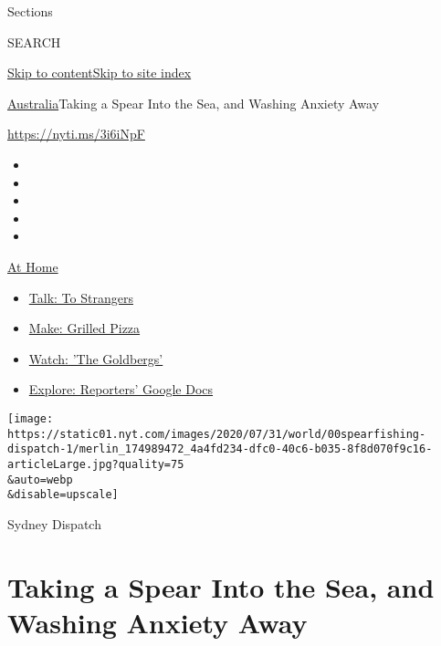 Sections

SEARCH

\protect\hyperlink{site-content}{Skip to
content}\protect\hyperlink{site-index}{Skip to site index}

\href{/section/world/australia}{Australia}\textbar{}Taking a Spear Into
the Sea, and Washing Anxiety Away

\url{https://nyti.ms/3i6iNpF}

\begin{itemize}
\item
\item
\item
\item
\item
\end{itemize}

\href{https://www.nytimes.com/spotlight/at-home?action=click\&pgtype=Article\&state=default\&region=TOP_BANNER\&context=at_home_menu}{At
Home}

\begin{itemize}
\tightlist
\item
  \href{https://www.nytimes.com/2020/08/03/well/family/the-benefits-of-talking-to-strangers.html?action=click\&pgtype=Article\&state=default\&region=TOP_BANNER\&context=at_home_menu}{Talk:
  To Strangers}
\item
  \href{https://www.nytimes.com/2020/08/01/at-home/coronavirus-make-pizza-on-a-grill.html?action=click\&pgtype=Article\&state=default\&region=TOP_BANNER\&context=at_home_menu}{Make:
  Grilled Pizza}
\item
  \href{https://www.nytimes.com/2020/07/31/arts/television/goldbergs-abc-stream.html?action=click\&pgtype=Article\&state=default\&region=TOP_BANNER\&context=at_home_menu}{Watch:
  'The Goldbergs'}
\item
  \href{https://www.nytimes.com/interactive/2020/at-home/even-more-reporters-editors-diaries-lists-recommendations.html?action=click\&pgtype=Article\&state=default\&region=TOP_BANNER\&context=at_home_menu}{Explore:
  Reporters' Google Docs}
\end{itemize}

\texttt{[image: https://static01.nyt.com/images/2020/07/31/world/00spearfishing-dispatch-1/merlin\_174989472\_4a4fd234-dfc0-40c6-b035-8f8d070f9c16-articleLarge.jpg?quality=75\\\&auto=webp\\\&disable=upscale]}

Sydney Dispatch

\hypertarget{taking-a-spear-into-the-sea-and-washing-anxiety-away}{%
\section{Taking a Spear Into the Sea, and Washing Anxiety
Away}\label{taking-a-spear-into-the-sea-and-washing-anxiety-away}}

